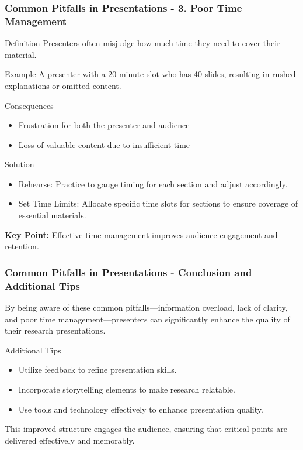 \documentclass[aspectratio=169]{beamer}
\begin{document}
\begin{frame}[fragile]
    \frametitle{Common Pitfalls in Presentations - 3. Poor Time Management}
    \begin{block}{Definition}
        Presenters often misjudge how much time they need to cover their material.
    \end{block}
    \begin{exampleblock}{Example}
        A presenter with a 20-minute slot who has 40 slides, resulting in rushed explanations or omitted content.
    \end{exampleblock}
    \begin{block}{Consequences}
        \begin{itemize}
            \item Frustration for both the presenter and audience
            \item Loss of valuable content due to insufficient time
        \end{itemize}
    \end{block}
    \begin{block}{Solution}
        \begin{itemize}
            \item Rehearse: Practice to gauge timing for each section and adjust accordingly.
            \item Set Time Limits: Allocate specific time slots for sections to ensure coverage of essential materials.
        \end{itemize}
    \end{block}
    \textbf{Key Point:} Effective time management improves audience engagement and retention.
\end{frame}

\begin{frame}[fragile]
    \frametitle{Common Pitfalls in Presentations - Conclusion and Additional Tips}
    By being aware of these common pitfalls—information overload, lack of clarity, and poor time management—presenters can significantly enhance the quality of their research presentations. 
    \begin{block}{Additional Tips}
        \begin{itemize}
            \item Utilize feedback to refine presentation skills.
            \item Incorporate storytelling elements to make research relatable.
            \item Use tools and technology effectively to enhance presentation quality.
        \end{itemize}
    \end{block}
    This improved structure engages the audience, ensuring that critical points are delivered effectively and memorably.
\end{frame}
\end{document}
